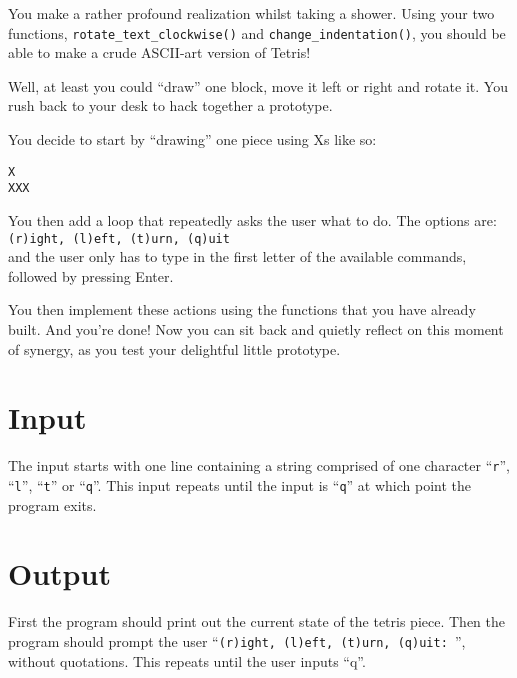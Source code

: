 

You make a rather profound realization whilst taking a shower.
Using your two functions, \texttt{rotate\_text\_clockwise()} and \texttt{change\_indentation()}, 
you should be able to make a crude ASCII-art version of Tetris!

Well, at least you could ``draw'' one block, move it left or right and rotate it.
You rush back to your desk to hack together a prototype.

You decide to start by ``drawing'' one piece using Xs like so:
\begin{verbatim}
X
XXX
\end{verbatim}

You then add a loop that repeatedly asks the user what to do. The options are:\\
\texttt{(r)ight, (l)eft, (t)urn, (q)uit}\\
and the user only has to type in the first letter of the available commands, followed by pressing Enter.

You then implement these actions using the functions that you have already built.
And you're done! Now you can sit back and quietly reflect on this moment of synergy, as you test your delightful little prototype.

\section*{Input}
The input starts with one line containing a string comprised of one character ``\texttt{r}'', ``\texttt{l}'', ``\texttt{t}'' or ``\texttt{q}''.
This input repeats until the input is ``\texttt{q}'' at which point the program exits.

\section*{Output}
First the program should print out the current state of the tetris piece.
Then the program should prompt the user ``\texttt{(r)ight, (l)eft, (t)urn, (q)uit: }'', without quotations.
This repeats until the user inputs ``q''.

